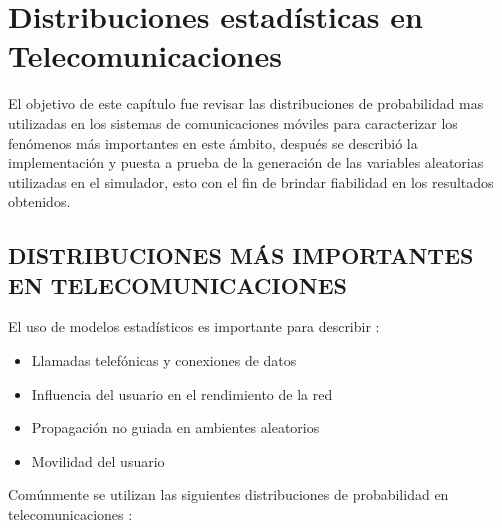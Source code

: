 
\chapter{Distribuciones estadísticas en Telecomunicaciones} %

\label{AppendixA} %

El objetivo de este capítulo fue revisar las distribuciones de probabilidad mas utilizadas en los sistemas de comunicaciones móviles para caracterizar los fenómenos más importantes en este ámbito, después se describió la implementación y puesta a prueba de la generación de las variables aleatorias utilizadas en el simulador, esto con el fin de brindar fiabilidad en los resultados obtenidos.


\section{DISTRIBUCIONES MÁS IMPORTANTES EN TELECOMUNICACIONES}

El uso de modelos estadísticos es importante para describir \parencite{Correia2018}:
\begin{itemize}
    \item Llamadas telefónicas y conexiones de datos
    \item Influencia del usuario en el rendimiento de la red
    \item Propagación no guiada en ambientes aleatorios
    \item Movilidad del usuario
\end{itemize}

Comúnmente se utilizan las siguientes distribuciones de probabilidad en telecomunicaciones \parencite{Correia2018}:

